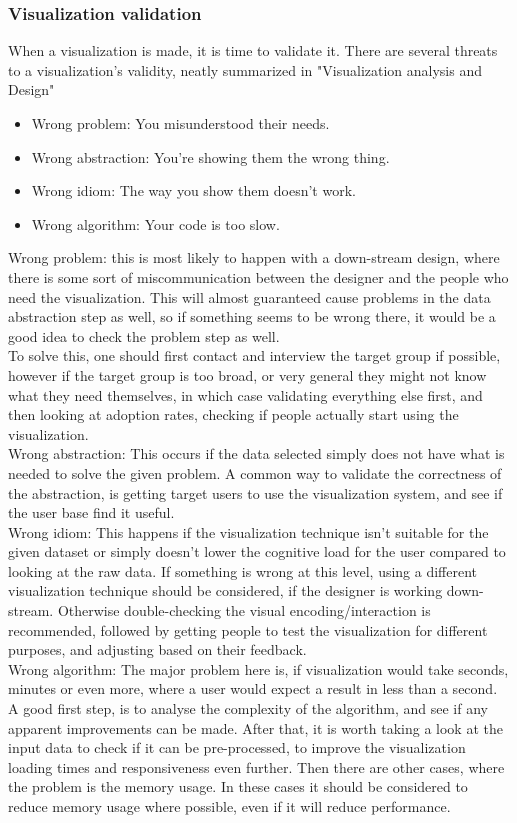 \documentclass[Report.tex]{subfiles}
\begin{document}
	\subsubsection{Visualization validation}
	When a visualization is made, it is time to validate it. There are several threats to a visualization's validity, neatly summarized in "Visualization analysis and Design" \cite[75]{Tamara}
	\begin{itemize}
		\item Wrong problem: You misunderstood their needs.
		\item Wrong abstraction: You're showing them the wrong thing.
		\item Wrong idiom: The way you show them doesn't work.
		\item Wrong algorithm: Your code is too slow.
	\end{itemize}
	Wrong problem: this is most likely to happen with a down-stream design, where there is some sort of miscommunication between the designer and the people who need the visualization. This will almost guaranteed cause problems in the data abstraction step as well, so if something seems to be wrong there, it would be a good idea to check the problem step as well.\\
	To solve this, one should first contact and interview the target group if possible, however if the target group is too broad, or very general they might not know what they need themselves, in which case validating everything else first, and then looking at adoption rates, checking if people actually start using the visualization.\\
	Wrong abstraction: This occurs if the data selected simply does not have what is needed to solve the given problem. A common way to validate the correctness of the abstraction, is getting target users to use the visualization system, and see if the user base find it useful.\\
	 Wrong idiom: This happens if the visualization technique isn't suitable for the given dataset or simply doesn't lower the cognitive load for the user compared to looking at the raw data. If something is wrong at this level, using a different visualization technique should be considered, if the designer is working down-stream. Otherwise double-checking the visual encoding/interaction is recommended, followed by getting people to test the visualization for different purposes, and adjusting based on their feedback.\\
	 Wrong algorithm: The major problem here is, if visualization would take seconds, minutes or even more, where a user would expect a result in less than a second. \\
	 A good first step, is to analyse the complexity of the algorithm, and see if any apparent improvements can be made. After that, it is worth taking a look at the input data to check if it can be pre-processed, to improve the visualization loading times and responsiveness even further. Then there are other cases, where the problem is the memory usage. In these cases it should be considered to reduce memory usage where possible, even if it will reduce performance.
\end{document}
